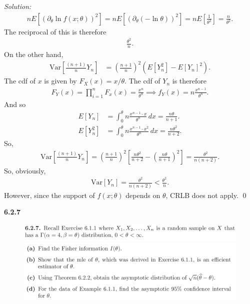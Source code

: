 \documentclass{book}
\theoremstyle{definition}
\newcommand{\p}{\partial}
\newcommand{\Var}{\text{Var}}
\newcommand{\f}[2]{\frac{#1}{#2}}
\newcommand{\lp}{\left(}
\newcommand{\rp}{\right)}
\newcommand{\lb}{\left[}
\newcommand{\rb}{\right]}
\begin{document}
\noindent \textit{Solution:} 
\begin{align}
nE\lb \lp \p_\theta \ln f(x;\theta) \rp^2 \rb = nE \lb \lp \p_\theta (-\ln \theta) \rp^2 \rb = n E\lb \f{1}{\theta^2} \rb = \f{n}{\theta^2}.
\end{align}
The reciprocal of this is therefore 
\begin{align}
\f{\theta^2}{n}.
\end{align}
On the other hand,
\begin{align}
\Var\lb \f{(n+1)}{n}Y_n \rb &= \lp \f{n+1}{n} \rp^2 \lp E[Y_n^2] - E[Y_n]^2 \rp.
\end{align}
The cdf of $x$ is given by $F_X(x) = x/\theta$. The cdf of $Y_n$ is therefore 
\begin{align}
F_Y(x) = \prod^n_{i=1}F_x(x) = \f{x^n}{\theta^n} \implies f_Y(x) = n\f{x^{n-1}}{\theta^n}.
\end{align}
And so 
\begin{align}
E[Y_n] &= \int^\theta_0 n \f{x^{n-1}\cdot x}{\theta^n}\,dx = \f{n\theta}{n+1}.\\
E[Y_n^2] &= \int^\theta_0 n \f{x^{n-1}\cdot x^2}{\theta^n}\,dx = \f{n\theta^2}{n+2}.
\end{align}
So,
\begin{align}
\Var\lb \f{(n+1)}{n}Y_n \rb = \lp \f{n+1}{n} \rp^2 \lb  \f{n\theta^2}{n+2}  - \lp \f{n\theta}{n+1} \rp^2 \rb = \f{\theta^2}{n(n+2)}.
\end{align}
So, obviously,
\begin{align}
\Var[Y_n]  = \f{\theta^2}{n(n+2)} < \f{\theta^2}{n}.
\end{align}
However, since the support of $f(x;\theta)$ depends on $\theta$, CRLB does not apply. 
\qed












\newpage
\noindent \textbf{6.2.7}
\begin{figure}[!htb]
	\centering
	\includegraphics[scale=0.25]{627a}
	\includegraphics[scale=0.25]{627b}
\end{figure}
\end{document}
